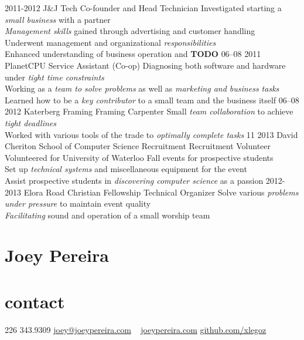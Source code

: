 \documentclass[]{friggeri-cv}
\newcommand{\imp}[1] {{\em #1}}
\begin{document}
\begin{entrylist}
  \entry
  	{2011-2012}
  	{J\&J Tech}
  	{Co-founder and Head Technician}
  	{Investigated starting a \imp{small business} with a partner \\
	\imp{Management skills} gained through advertising and customer handling \\
	Underwent management and organizational \imp{responsibilities} \\
	Enhanced understanding of business operation and  \textbf{TODO} }
  \entry
    {06–08 2011}
    {PlanetCPU}
    {Service Assistant (Co-op)}
    {Diagnosing both software and hardware under \imp{tight time constraints} \\	Working as a \imp{team to solve problems} as well as \imp{marketing and business tasks} \\
    Learned how to be a \imp{key contributor} to a small team and the business itself}
  \entry
    {06–08 2012}
    {Katerberg Framing}
    {Framing Carpenter}
    {Small \imp{team collaboration} to achieve \imp{tight deadlines} \\
    Worked with various tools of the trade to \imp{optimally complete tasks}  
   }
  \entry
  	{11 2013}
  	{David Cheriton School of Computer Science Recruitment}
  	{Recruitment Volunteer}
	{Volunteered for University of Waterloo Fall events for prospective students \\
  	Set up \imp{technical systems} and miscellaneous equipment for the event \\
	Assist prospective students in \imp{discovering computer science} as a passion}
  \entry
  	{2012-2013}
  	{Elora Road Christian Fellowship}
  	{Technical Organizer}
	{Solve various \imp{problems under pressure} to maintain event quality\\
	\imp{Facilitating} sound and operation of a small worship team}
  	

\end{entrylist}

\newpage

\begin{asidetwo}  	
	\section{Joey Pereira}
	\section{contact}
    226 343.9309
    \href{mailto:joey@joeypereira.com}{joey@joeypereira.com}
    ~
    \href{http://joeypereira.com}{joeypereira.com}
    \href{http://www.github.com/xlegoz}{github.com/xlegoz}
\end{asidetwo}
\end{document}
